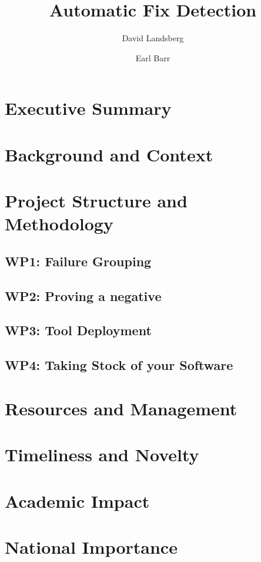 \documentclass[12pt, twocolumn]{article}
\title{Automatic Fix Detection}
\author{David Landsberg \and Earl Barr}%
\date{%
}
\newcommand{\todo}[1]{{\color{red}#1}}
\begin{document}
\maketitle{}

\section{Executive Summary}
     

\section{Background and Context}
    

\section{Project Structure and Methodology}
    
    

\subsection*{WP1: Failure Grouping}
    

 


\subsection*{WP2: Proving a negative}
    

\subsection*{WP3: Tool Deployment} %
    


\subsection*{WP4: Taking Stock of your Software}
     

\section{Resources and Management}
    

\section{Timeliness and Novelty}
    

\section{Academic Impact}
    

\section{National Importance}
    



\end{document}
